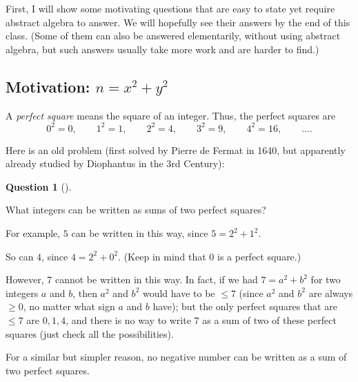 \documentclass[numbers=enddot,12pt,final,onecolumn,notitlepage]{scrartcl}%
\numberwithin{exer}{subsection}
\theoremstyle{definition}
\newtheorem{quest}[theo]{Question}
\newenvironment{question}[1][]
{\begin{quest}[#1]\begin{leftbar}}
{\end{leftbar}\end{quest}}
\newenvironment{question}[1][Question]{\noindent\textbf{#1.} }{\ \rule{0.5em}{0.5em}}
\begin{document}
First, I will show some motivating questions that are easy to state yet
require abstract algebra to answer. We will hopefully see their answers by the
end of this class. (Some of them can also be answered elementarily, without
using abstract algebra, but such answers usually take more work and are harder
to find.)

\subsection{\label{subsect.intro.sum-of-2sq}Motivation: $n=x^{2}+y^{2}$}

A \textit{perfect square} means the square of an integer. Thus, the perfect
squares are
\[
0^{2} = 0, \qquad1^{2} = 1, \qquad2^{2} = 4, \qquad3^{2} = 9, \qquad4^{2} =
16, \qquad\ldots.
\]


Here is an old problem (first solved by Pierre de Fermat in 1640, but
apparently already studied by Diophantus in the 3rd Century):

\begin{question}
\label{quest.intro.sum-of-2sq.1} What integers can be written as sums of two
perfect squares?
\end{question}

For example, $5$ can be written in this way, since $5=2^{2}+1^{2}$.

So can $4$, since $4=2^{2}+0^{2}$. (Keep in mind that $0$ is a perfect square.)

However, $7$ cannot be written in this way. In fact, if we had $7 = a^{2} +
b^{2}$ for two integers $a$ and $b$, then $a^{2}$ and $b^{2}$ would have to be
$\leq7$ (since $a^{2}$ and $b^{2}$ are always $\geq0$, no matter what sign $a$
and $b$ have); but the only perfect squares that are $\leq7$ are $0,1,4$, and
there is no way to write $7$ as a sum of two of these perfect squares (just
check all the possibilities).

For a similar but simpler reason, no negative number can be written as a sum
of two perfect squares.
\end{document}
